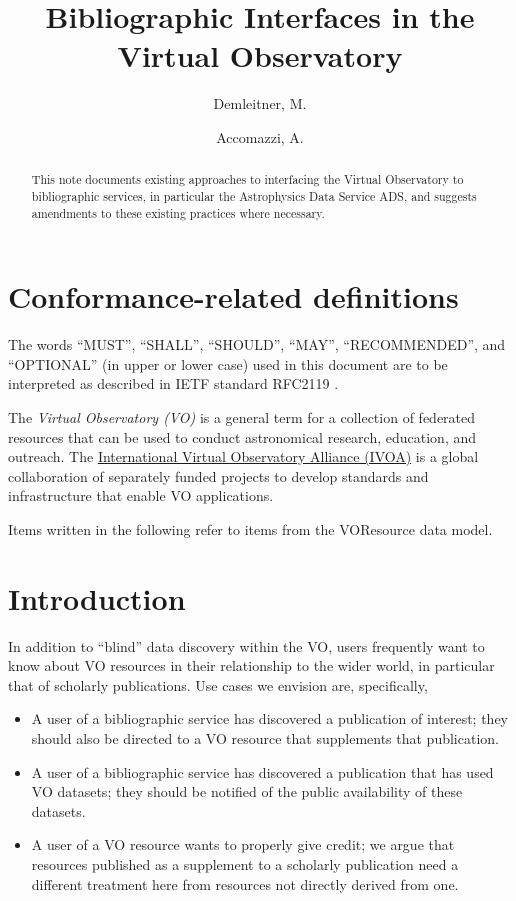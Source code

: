 \documentclass[11pt,a4paper]{ivoa}
\title{Bibliographic Interfaces in the Virtual Observatory}
\author[http://www.ivoa.net/cgi-bin/twiki/bin/view/IVOA/MarkusDemleitner]{Demleitner, M.}
\author{Accomazzi, A.}
\begin{document}
\begin{abstract}
This note documents existing approaches to interfacing the Virtual
Observatory to bibliographic services, in particular the Astrophysics
Data Service ADS, and suggests amendments to these existing practices
where necessary.
\end{abstract}


\section*{Conformance-related definitions}

The words ``MUST'', ``SHALL'', ``SHOULD'', ``MAY'', ``RECOMMENDED'', and
``OPTIONAL'' (in upper or lower case) used in this document are to be
interpreted as described in IETF standard RFC2119 \citep{std:RFC2119}.

The \emph{Virtual Observatory (VO)} is a
general term for a collection of federated resources that can be used
to conduct astronomical research, education, and outreach.
The \href{https://www.ivoa.net}{International
Virtual Observatory Alliance (IVOA)} is a global
collaboration of separately funded projects to develop standards and
infrastructure that enable VO applications.

Items written  in the following refer to items from
the VOResource data model.

\section{Introduction}

In addition to ``blind'' data discovery within the VO, users frequently
want to know about VO resources in their relationship to the wider
world, in particular that of scholarly publications.  Use cases we
envision are, specifically,

\begin{itemize}
\item A user of a bibliographic service has discovered a publication of
interest; they should also be directed to a VO resource that supplements
that publication.

\item A user of a bibliographic service has discovered a publication
that has used VO datasets; they should be notified of the public
availability of these datasets.

\item A user of a VO resource wants to properly give credit; we
argue that resources published as a supplement to a scholarly
publication need a different treatment here from resources not directly
derived from one.
\end{itemize}
\end{document}
